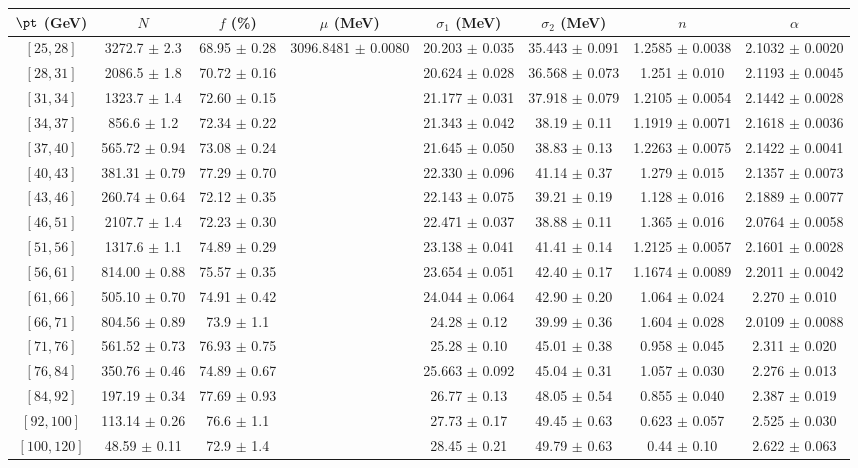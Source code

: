 \begin{tabular}{c||c|c|c|c|c|c|c}
$\pt$ (GeV) & $N$ & $f$ (\%) & $\mu$ (MeV) & $\sigma_1$ (MeV) & $\sigma_2$ (MeV) & $n$ & $\alpha$ \\
\hline
$[25, 28]$ & 3272.7 $\pm$ 2.3 & 68.95 $\pm$ 0.28 & \multirow{17}{*}{3096.8481 $\pm$ 0.0080} & 20.203 $\pm$ 0.035 & 35.443 $\pm$ 0.091 & 1.2585 $\pm$ 0.0038 & 2.1032 $\pm$ 0.0020\\
$[28, 31]$ & 2086.5 $\pm$ 1.8 & 70.72 $\pm$ 0.16 &  & 20.624 $\pm$ 0.028 & 36.568 $\pm$ 0.073 & 1.251 $\pm$ 0.010 & 2.1193 $\pm$ 0.0045\\
$[31, 34]$ & 1323.7 $\pm$ 1.4 & 72.60 $\pm$ 0.15 &  & 21.177 $\pm$ 0.031 & 37.918 $\pm$ 0.079 & 1.2105 $\pm$ 0.0054 & 2.1442 $\pm$ 0.0028\\
$[34, 37]$ & 856.6 $\pm$ 1.2 & 72.34 $\pm$ 0.22 &  & 21.343 $\pm$ 0.042 & 38.19 $\pm$ 0.11 & 1.1919 $\pm$ 0.0071 & 2.1618 $\pm$ 0.0036\\
$[37, 40]$ & 565.72 $\pm$ 0.94 & 73.08 $\pm$ 0.24 &  & 21.645 $\pm$ 0.050 & 38.83 $\pm$ 0.13 & 1.2263 $\pm$ 0.0075 & 2.1422 $\pm$ 0.0041\\
$[40, 43]$ & 381.31 $\pm$ 0.79 & 77.29 $\pm$ 0.70 &  & 22.330 $\pm$ 0.096 & 41.14 $\pm$ 0.37 & 1.279 $\pm$ 0.015 & 2.1357 $\pm$ 0.0073\\
$[43, 46]$ & 260.74 $\pm$ 0.64 & 72.12 $\pm$ 0.35 &  & 22.143 $\pm$ 0.075 & 39.21 $\pm$ 0.19 & 1.128 $\pm$ 0.016 & 2.1889 $\pm$ 0.0077\\
$[46, 51]$ & 2107.7 $\pm$ 1.4 & 72.23 $\pm$ 0.30 &  & 22.471 $\pm$ 0.037 & 38.88 $\pm$ 0.11 & 1.365 $\pm$ 0.016 & 2.0764 $\pm$ 0.0058\\
$[51, 56]$ & 1317.6 $\pm$ 1.1 & 74.89 $\pm$ 0.29 &  & 23.138 $\pm$ 0.041 & 41.41 $\pm$ 0.14 & 1.2125 $\pm$ 0.0057 & 2.1601 $\pm$ 0.0028\\
$[56, 61]$ & 814.00 $\pm$ 0.88 & 75.57 $\pm$ 0.35 &  & 23.654 $\pm$ 0.051 & 42.40 $\pm$ 0.17 & 1.1674 $\pm$ 0.0089 & 2.2011 $\pm$ 0.0042\\
$[61, 66]$ & 505.10 $\pm$ 0.70 & 74.91 $\pm$ 0.42 &  & 24.044 $\pm$ 0.064 & 42.90 $\pm$ 0.20 & 1.064 $\pm$ 0.024 & 2.270 $\pm$ 0.010\\
$[66, 71]$ & 804.56 $\pm$ 0.89 & 73.9 $\pm$ 1.1 &  & 24.28 $\pm$ 0.12 & 39.99 $\pm$ 0.36 & 1.604 $\pm$ 0.028 & 2.0109 $\pm$ 0.0088\\
$[71, 76]$ & 561.52 $\pm$ 0.73 & 76.93 $\pm$ 0.75 &  & 25.28 $\pm$ 0.10 & 45.01 $\pm$ 0.38 & 0.958 $\pm$ 0.045 & 2.311 $\pm$ 0.020\\
$[76, 84]$ & 350.76 $\pm$ 0.46 & 74.89 $\pm$ 0.67 &  & 25.663 $\pm$ 0.092 & 45.04 $\pm$ 0.31 & 1.057 $\pm$ 0.030 & 2.276 $\pm$ 0.013\\
$[84, 92]$ & 197.19 $\pm$ 0.34 & 77.69 $\pm$ 0.93 &  & 26.77 $\pm$ 0.13 & 48.05 $\pm$ 0.54 & 0.855 $\pm$ 0.040 & 2.387 $\pm$ 0.019\\
$[92, 100]$ & 113.14 $\pm$ 0.26 & 76.6 $\pm$ 1.1 &  & 27.73 $\pm$ 0.17 & 49.45 $\pm$ 0.63 & 0.623 $\pm$ 0.057 & 2.525 $\pm$ 0.030\\
$[100, 120]$ & 48.59 $\pm$ 0.11 & 72.9 $\pm$ 1.4 &  & 28.45 $\pm$ 0.21 & 49.79 $\pm$ 0.63 & 0.44 $\pm$ 0.10 & 2.622 $\pm$ 0.063\\
\end{tabular}
